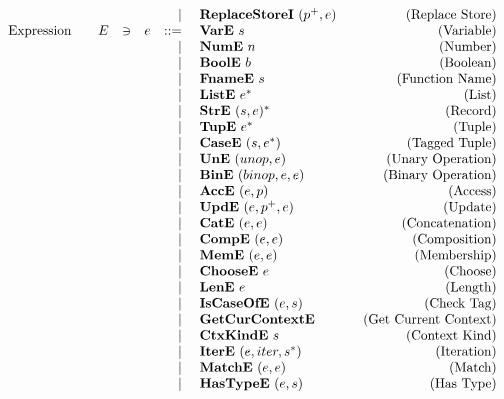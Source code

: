 {\begin{align*}
\begin{array}{lcccrlr}
    &&&& | & ~ \replacestorei ~ (p^+, e) &\quad\text{(Replace Store)} \\
%
  \text{Expression}\quad& E &\ni& e &::=& ~ \vare ~ s &\quad\text{(Variable)} \\
    &&&& | & ~ \nume ~ n &\quad\text{(Number)} \\
    &&&& | & ~ \boole ~ b &\quad\text{(Boolean)} \\
    &&&& | & ~ \fnamee ~ s &\quad\text{(Function Name)} \\
    &&&& | & ~ \liste ~ \seq e &\quad\text{(List)} \\
    &&&& | & ~ \stre ~ \seq{(s, e)} &\quad\text{(Record)} \\
    &&&& | & ~ \tupe ~ \seq e &\quad\text{(Tuple)} \\
    &&&& | & ~ \casee ~ (s, \seq e) &\quad\text{(Tagged Tuple)} \\
    &&&& | & ~ \une ~ (unop, e) &\quad\text{(Unary Operation)} \\
    &&&& | & ~ \bine ~ (binop, e, e) &\quad\text{(Binary Operation)} \\
    &&&& | & ~ \acce ~ (e, p) &\quad\text{(Access)} \\
    &&&& | & ~ \upde ~ (e, p^+, e) &\quad\text{(Update)} \\
    &&&& | & ~ \cate ~ (e, e) &\quad\text{(Concatenation)} \\
    &&&& | & ~ \compe ~ (e, e) &\quad\text{(Composition)} \\
    &&&& | & ~ \meme ~ (e, e) &\quad\text{(Membership)} \\
    &&&& | & ~ \choosee ~ e &\quad\text{(Choose)} \\
    &&&& | & ~ \lene ~ e &\quad\text{(Length)} \\
    &&&& | & ~ \iscaseofe ~ (e, s) &\quad\text{(Check Tag)} \\
    &&&& | & ~ \getcurctxe  &\quad\text{(Get Current Context)} \\
    &&&& | & ~ \ctxkinde ~ s &\quad\text{(Context Kind)} \\
    &&&& | & ~ \itere ~ (e, iter, \seq{s}) &\quad\text{(Iteration)} \\
    &&&& | & ~ \matche ~ (e, e) &\quad\text{(Match)} \\
    &&&& | & ~ \hastypee ~ (e, s) &\quad\text{(Has Type)} \\
\end{array}
\end{align*}
}


